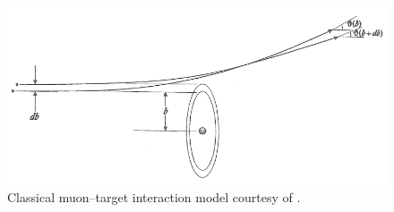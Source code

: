 \begin{figure}
  \centering
  \includegraphics[width=\textwidth]{Figures/scattering_model} 

  \caption[Classical muon--target interaction model.]{Classical muon--target interaction model courtesy of \cite{jose}.}
  \label{fig:scatteringmodel}
\end{figure}

